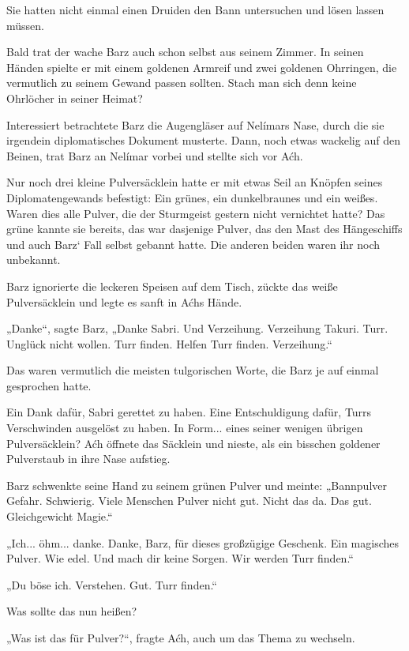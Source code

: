 Sie hatten nicht einmal einen Druiden den Bann untersuchen und lösen lassen müssen.\bigskip






Bald trat der wache Barz auch schon selbst aus seinem Zimmer. In seinen Händen spielte er mit einem goldenen Armreif und zwei goldenen Ohrringen, die vermutlich zu seinem Gewand passen sollten. Stach man sich denn keine Ohrlöcher in seiner Heimat?

Interessiert betrachtete Barz die Augengläser auf Nelímars Nase, durch die sie irgendein diplomatisches Dokument musterte. Dann, noch etwas wackelig auf den Beinen, trat Barz an Nelímar vorbei und stellte sich vor Aćh.

Nur noch drei kleine Pulversäcklein hatte er mit etwas Seil an Knöpfen seines Diplomatengewands befestigt: Ein grünes, ein dunkelbraunes und ein weißes. Waren dies alle Pulver, die der Sturmgeist gestern nicht vernichtet hatte? Das grüne kannte sie bereits, das war dasjenige Pulver, das den Mast des Hängeschiffs und auch Barz‘ Fall selbst gebannt hatte. Die anderen beiden waren ihr noch unbekannt.

Barz ignorierte die leckeren Speisen auf dem Tisch, zückte das weiße Pulversäcklein und legte es sanft in Aćhs Hände.

„Danke“, sagte Barz, „Danke Sabri. Und Verzeihung. Verzeihung Takuri. Turr. Unglück nicht wollen. Turr finden. Helfen Turr finden. Verzeihung.“

Das waren vermutlich die meisten tulgorischen Worte, die Barz je auf einmal gesprochen hatte.

Ein Dank dafür, Sabri gerettet zu haben. Eine Entschuldigung dafür, Turrs Verschwinden ausgelöst zu haben. In Form... eines seiner wenigen übrigen Pulversäcklein? Aćh öffnete das Säcklein und nieste, als ein bisschen goldener Pulverstaub in ihre Nase aufstieg.

Barz schwenkte seine Hand zu seinem grünen Pulver und meinte: „Bannpulver Gefahr. Schwierig. Viele Menschen Pulver nicht gut. Nicht das da. Das gut. Gleichgewicht Magie.“

„Ich... öhm... danke. Danke, Barz, für dieses großzügige Geschenk. Ein magisches Pulver. Wie edel. Und mach dir keine Sorgen. Wir werden Turr finden.“

„Du böse ich. Verstehen. Gut. Turr finden.“

Was sollte das nun heißen?

„Was ist das für Pulver?“, fragte Aćh, auch um das Thema zu wechseln.

